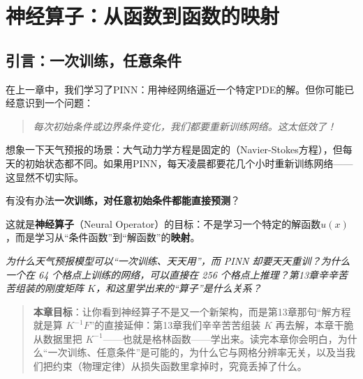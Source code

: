 \chapter{神经算子：从函数到函数的映射}

\section*{引言：一次训练，任意条件}



在上一章中，我们学习了PINN：用神经网络逼近一个特定PDE的解。但你可能已经意识到一个问题：

\begin{quote}
\textit{每次初始条件或边界条件变化，我们都要重新训练网络。这太低效了！}
\end{quote}

想象一下天气预报的场景：大气动力学方程是固定的（Navier-Stokes方程），但每天的初始状态都不同。如果用PINN，每天凌晨都要花几个小时重新训练网络——这显然不切实际。

有没有办法\textbf{一次训练，对任意初始条件都能直接预测}？

这就是\textbf{神经算子}（Neural Operator）的目标：不是学习一个特定的解函数$u(x)$，而是学习从“条件函数”到“解函数”的\textbf{映射}。

\vspace{0.3cm}
\noindent\textit{为什么天气预报模型可以“一次训练、天天用”，而 PINN 却要天天重训？为什么一个在 64 个格点上训练的网络，可以直接在 256 个格点上推理？第13章辛辛苦苦组装的刚度矩阵 $K$，和这里学出来的“算子”是什么关系？}

\begin{quote}
\textbf{本章目标}：让你看到神经算子不是又一个新架构，而是第13章那句“解方程就是算 $K^{-1}F$”的直接延伸：第13章我们辛辛苦苦组装 $K$ 再去解，本章干脆从数据里把 $K^{-1}$——也就是格林函数——学出来。读完本章你会明白，为什么“一次训练、任意条件”是可能的，为什么它与网格分辨率无关，以及当我们把约束（物理定律）从损失函数里拿掉时，究竟丢掉了什么。
\end{quote}

